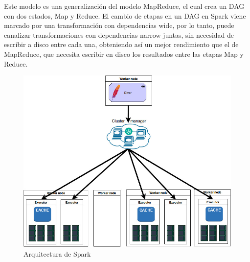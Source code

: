 Este modelo es una generalización del modelo MapReduce, el cual crea un DAG con dos estados, Map y Reduce. El cambio de etapas en un DAG en Spark viene marcado por una transformación con dependencias wide, por lo tanto, puede canalizar transformaciones con dependencias narrow juntas, sin necesidad de escribir a disco entre cada una, obteniendo así un mejor rendimiento que el de MapReduce, que necesita escribir en disco los resultados entre las etapas Map y Reduce.\\

\begin{figure}[t]
	\includegraphics[scale=0.6]{img/arquitectura}
	\centering
	\caption{Arquitectura de Spark}
	\label{Arquitectura}
\end{figure}

